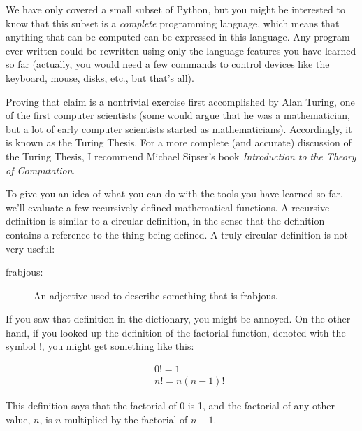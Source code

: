 \documentclass[10pt]{book}
\begin{document}

We have only covered a small subset of Python, but you might
be interested to know that this subset is a {\em complete}
programming language, which means that anything that can be
computed can be expressed in this language.  Any program ever written
could be rewritten using only the language features you have learned
so far (actually, you would need a few commands to control devices
like the keyboard, mouse, disks, etc., but that's all).

Proving that claim is a nontrivial exercise first accomplished by Alan
Turing, one of the first computer scientists (some would argue that he
was a mathematician, but a lot of early computer scientists started as
mathematicians).  Accordingly, it is known as the Turing Thesis.
For a more complete (and accurate) discussion of the Turing Thesis,
I recommend Michael Sipser's book {\em Introduction to the
Theory of Computation}.

To give you an idea of what you can do with the tools you have learned
so far, we'll evaluate a few recursively defined mathematical
functions.  A recursive definition is similar to a circular
definition, in the sense that the definition contains a reference to
the thing being defined.  A truly circular definition is not very
useful:

\begin{description}

\item[frabjous:] An adjective used to describe something that is frabjous.

\end{description}


If you saw that definition in the dictionary, you might be annoyed. On
the other hand, if you looked up the definition of the factorial
function, denoted with the symbol $!$, you might get something like
this:

\vspace{-0.35in}
\begin{eqnarray*}
&&  0! = 1 \\
&&  n! = n (n-1)!
\end{eqnarray*}
\vspace{-0.25in}

This definition says that the factorial of 0 is 1, and the factorial
of any other value, $n$, is $n$ multiplied by the factorial of $n-1$.
\end{document}
